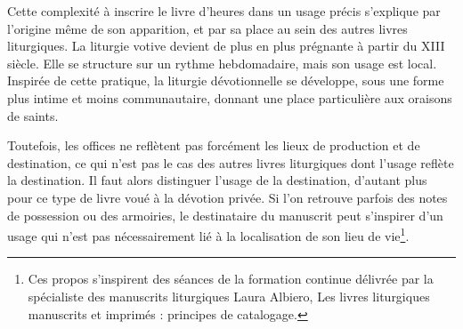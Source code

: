\documentclass[a4paper,12pt,twoside]{book}
\begin{document}
	Cette complexité à inscrire le livre d'heures dans un usage précis s'explique par l'origine même de son apparition, et par sa place au sein des autres livres liturgiques. La liturgie votive devient de plus en plus prégnante à partir du \textsc{XIII} siècle. Elle se structure sur un rythme hebdomadaire, mais son usage est local. Inspirée de cette pratique, la liturgie dévotionnelle se développe, sous une forme plus intime et moins communautaire, donnant une place particulière aux oraisons de saints. 
	
	Toutefois, les offices ne reflètent pas forcément les lieux de production et de destination, ce qui n’est pas le cas des autres livres liturgiques dont l’usage reflète la destination. Il faut alors distinguer l'usage de la destination, d'autant plus pour ce type de livre voué à la dévotion privée. Si l'on retrouve parfois des notes de possession ou des armoiries, le destinataire du manuscrit peut s'inspirer d’un usage qui n'est pas nécessairement lié à la localisation de son lieu de vie\footnote{Ces propos s'inspirent des séances de la formation continue délivrée par la spécialiste des manuscrits liturgiques Laura Albiero, \og Les livres liturgiques manuscrits et imprimés : principes de catalogage\fg{}.}. \\
\end{document}
